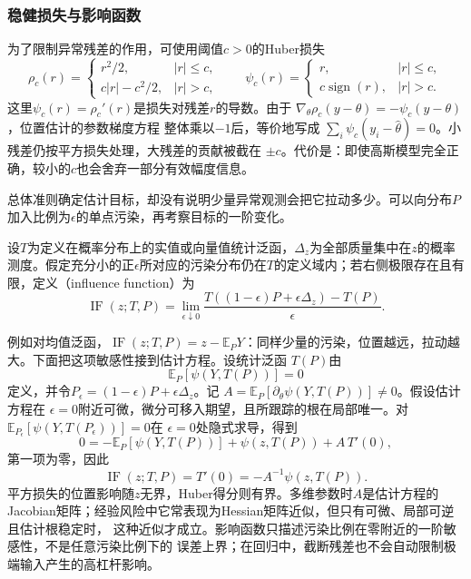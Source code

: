 \subsubsection{稳健损失与影响函数}

为了限制异常残差的作用，可使用阈值\(c>0\)的Huber损失
\[
  \rho_c(r)=
  \begin{cases}
    r^2/2,& |r|\leq c,\\
    c|r|-c^2/2,& |r|>c,
  \end{cases}
  \qquad
  \psi_c(r)=
  \begin{cases}
    r,& |r|\leq c,\\
    c\operatorname{sign}(r),& |r|>c.
  \end{cases}
\]
这里\(\psi_c(r)=\rho_c'(r)\)是损失对残差\(r\)的导数。由于
\(\nabla_\theta\rho_c(y-\theta)=-\psi_c(y-\theta)\)，位置估计的参数梯度方程
整体乘以\(-1\)后，等价地写成
\(\sum_i\psi_c(y_i-\widehat\theta)=0\)。小残差仍按平方损失处理，大残差的贡献被截在
\(\pm c\)。代价是：即使高斯模型完全正确，较小的\(c\)也会舍弃一部分有效幅度信息。

总体准则确定估计目标，却没有说明少量异常观测会把它拉动多少。可以向分布\(P\)加入比例为\(\epsilon\)的单点污染，再考察目标的一阶变化。
\begin{definition}[影响函数]
  \label{def:statistics-influence-function}
  设\(T\)为定义在概率分布上的实值或向量值统计泛函，\(\Delta_z\)为全部质量集中在\(z\)的概率测度。假定充分小的正\(\epsilon\)所对应的污染分布仍在\(T\)的定义域内；若右侧极限存在且有限，定义（influence function）为
  \[ \operatorname{IF}(z;T,P)=\lim_{\epsilon\downarrow0}
    \frac{T((1-\epsilon)P+\epsilon\Delta_z)-T(P)}{\epsilon}. \]
\end{definition}
例如对均值泛函，\(\operatorname{IF}(z;T,P)=z-\mathbb E_PY\)：同样少量的污染，位置越远，拉动越大。下面把这项敏感性接到估计方程。设统计泛函
\(T(P)\)由
\[
  \mathbb{E}_P[\psi(Y,T(P))]=0
\]
定义，并令\(P_\epsilon=(1-\epsilon)P+\epsilon\Delta_z\)。记
\(A=\mathbb{E}_P[\partial_\theta\psi(Y,T(P))]\neq0\)。假设估计方程在
\(\epsilon=0\)附近可微，微分可移入期望，且所跟踪的根在局部唯一。对
\(\mathbb{E}_{P_\epsilon}[\psi(Y,T(P_\epsilon))]=0\)在
\(\epsilon=0\)处隐式求导，得到
\[
  0=-\mathbb{E}_P[\psi(Y,T(P))]
    +\psi(z,T(P))+A\,T'(0),
\]
第一项为零，因此
\begin{equation}
  \operatorname{IF}(z;T,P)=T'(0)
  =-A^{-1}\psi(z,T(P)).
  \label{eq:statistics-influence-function}
\end{equation}
平方损失的位置影响随\(z\)无界，Huber得分则有界。多维参数时\(A\)是估计方程的
Jacobian矩阵；经验风险中它常表现为Hessian矩阵近似，但只有可微、局部可逆且估计根稳定时，
这种近似才成立。影响函数只描述污染比例在零附近的一阶敏感性，不是任意污染比例下的
误差上界；在回归中，截断残差也不会自动限制极端输入产生的高杠杆影响。

